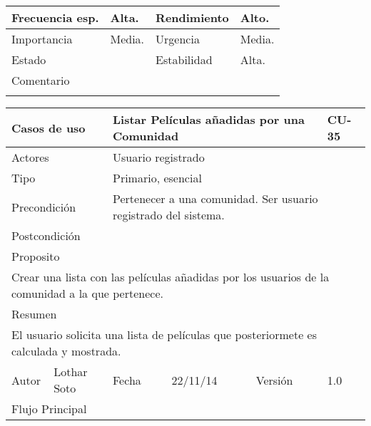 \documentclass{article}
\begin{document}
\begin{table}[h]
\begin{tabular}{|l|l|l|l|l|l|}
\hline
\multicolumn{1}{|p{2cm}|}{Frecuencia esp.} & \multicolumn{2}{p{3cm}}{Alta.} & \multicolumn{1}{|p{2cm}|}{Rendimiento} & \multicolumn{2}{p{3cm}|}{Alto.}\\
\hline
\multicolumn{1}{|p{2cm}|}{Importancia} & \multicolumn{2}{p{3cm}}{Media.} & \multicolumn{1}{|p{2cm}|}{Urgencia} & \multicolumn{2}{p{3cm}|}{Media.}\\
\hline
\multicolumn{1}{|p{2cm}|}{Estado} & \multicolumn{2}{p{3cm}}{} & \multicolumn{1}{|p{2cm}|}{Estabilidad} & \multicolumn{2}{p{3cm}|}{Alta.}\\
\hline
\multicolumn{6}{|p{10cm}|}{Comentario}\\
\hline
\multicolumn{6}{|p{10cm}|}{}\\
\hline
\end{tabular}
\end{table}
\begin{table}[h]
\begin{tabular}{|l|l|l|l|l|l|}
\hline
\multicolumn{2}{|p{2cm}|}{Casos de uso}  & \multicolumn{3}{p{7cm}|}{Listar Películas añadidas por una Comunidad} & CU-35 \\
\hline
\multicolumn{2}{|p{2cm}|}{Actores}       & \multicolumn{4}{p{8cm}|}{Usuario registrado}        \\
\hline
\multicolumn{2}{|p{2cm}|}{Tipo}          & \multicolumn{4}{p{8cm}|}{Primario, esencial}        \\
\hline
\multicolumn{2}{|p{2cm}|}{Precondición}  & \multicolumn{4}{p{8cm}|}{Pertenecer a una comunidad. Ser usuario registrado del sistema.}        \\
\hline
\multicolumn{2}{|p{2cm}|}{Postcondición} & \multicolumn{4}{p{8cm}|}{}        \\
\hline
\multicolumn{6}{|p{10cm}|}{Proposito}                                   \\
\hline
\multicolumn{6}{|p{10cm}|}{Crear una lista con las películas añadidas por los usuarios de la comunidad a la que pertenece.}                                            \\
\hline
\multicolumn{6}{|p{10cm}|}{Resumen}                                 \\
\hline
\multicolumn{6}{|p{10cm}|}{El usuario solicita una lista de películas que posteriormete es calculada y mostrada.}                                            \\
\hline
Autor         &       Lothar Soto        &  Fecha   &  22/11/14   &   Versión  & 1.0\\
\hline
\multicolumn{6}{|p{10cm}|}{Flujo Principal}\\

\end{tabular}
\end{table}
\end{document}
